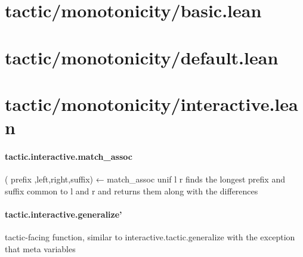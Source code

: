 \documentclass{article}
\begin{document}
\section{tactic/monotonicity/basic.lean}\section{tactic/monotonicity/default.lean}\section{tactic/monotonicity/interactive.lean}\paragraph{tactic.interactive.match\_assoc}
\par
\colorbox[RGB]{253,246,227}{{{{\color[RGB]{101, 123, 131} ( }}}{{{\color[RGB]{133, 153, 0} prefix }}}{{{\color[RGB]{101, 123, 131} ,left,right,suffix) ← match\_assoc unif l r }}}} finds the
longest prefix and suffix common to 
\colorbox[RGB]{253,246,227}{{{{\color[RGB]{101, 123, 131} l }}}} and 
\colorbox[RGB]{253,246,227}{{{{\color[RGB]{101, 123, 131} r }}}} and
returns them along with the differences
\paragraph{tactic.interactive.generalize'}
\par
tactic-facing function, similar to 
\colorbox[RGB]{253,246,227}{{{{\color[RGB]{101, 123, 131} interactive.tactic.generalize }}}} with the
exception that meta variables
\end{document}
